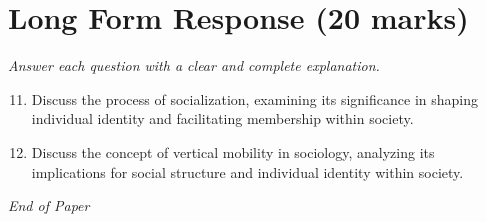 \documentclass[12pt]{article}
\begin{document}
\section*{Long Form Response (20 marks)}
\textit{Answer each question with a clear and complete explanation.}
\begin{enumerate}[label=\arabic*.]
\setcounter{enumi}{10}
\item Discuss the process of socialization, examining its significance in shaping individual identity and facilitating membership within society.
\item Discuss the concept of vertical mobility in sociology, analyzing its implications for social structure and individual identity within society.
\end{enumerate}

\vfill
\noindent\textit{End of Paper}
\end{document}

